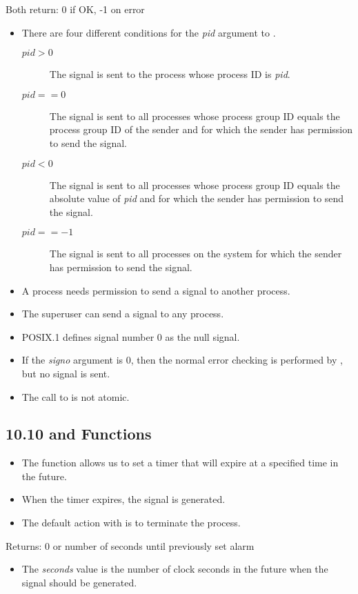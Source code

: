 \documentclass[]{article}
\begin{document}


Both return: 0 if OK, -1 on error

\begin{itemize}
\item There are four different conditions for the \emph{pid} argument to
.
\begin{description}
\item[$pid > 0$] The signal is sent to the process whose process ID is
\emph{pid}.
\item[$pid == 0$] The signal is sent to all processes whose process group ID
equals the process group ID of the sender and for which the sender has
permission to send the signal.
\item[$pid < 0$] The signal is sent to all processes whose process group ID
equals the absolute value of \emph{pid} and for which the sender has permission
to send the signal.
\item[$pid == -1$] The signal is sent to all processes on the system for which
the sender has permission to send the signal.
\end{description}
\item A process needs permission to send a signal to another process.
\item The superuser can send a signal to any process.
\item POSIX.1 defines signal number 0 as the null signal.
\item If the \emph{signo} argument is 0, then the normal error checking is
performed by , but no signal is sent.
\item The call to  is not atomic.
\end{itemize}

\subsection*{10.10  and  Functions}
\begin{itemize}
\item The  function allows us to set a timer that will expire at a
specified time in the future.
\item When the timer expires, the  signal is generated.
\item The default action with  is to terminate the process.
\end{itemize}



Returns: 0 or number of seconds until previously set alarm

\begin{itemize}
\item The \emph{seconds} value is the number of clock seconds in the future when
the signal should be generated.
\end{itemize}
\end{document}
